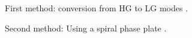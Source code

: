 \begin{figure}[htbp]
    \centering
    \begin{subfigure}[b]{0.3\textwidth}
        \centering
        \caption{First method: conversion from HG to LG modes \cite{Yao-Padgett:2011}.}
    \end{subfigure}
    \hfill
    \begin{subfigure}[b]{0.3\textwidth}
        \centering
        \caption{Second method: Using a spiral phase plate \cite{Yao-Padgett:2011}.}
    \end{subfigure}
    \hfill
    \begin{subfigure}[b]{0.3\textwidth}
        \centering

\end{subfigure}
\end{figure}
